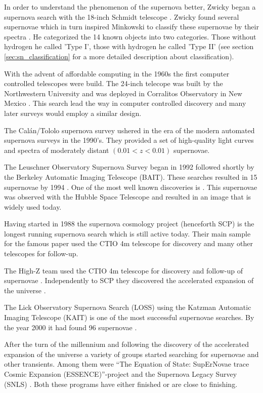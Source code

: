 In order to understand the phenomenon of the supernova better, Zwicky began a supernova search with the 18-inch Schmidt telescope . Zwicky found several supernovae which in turn inspired Minkowski to classify these supernovae by their spectra \citet{1941PASP...53..224M}. 
He categorized the 14 known objects into two categories. Those without hydrogen he called 'Type I', those with hydrogen he called 'Type II' (see section \ref{sec:sn_classification} for a more detailed description about classification).

With the advent of affordable computing in the 1960s the first computer controlled telescopes were build. The 24-inch telecope was built by the Northwestern University and was deployed in Corralitos Observatory in New Mexico \citep{1975PASP...87..565C}. This search lead the way in computer controlled discovery and many later surveys would employ a similar design.

The Cal\'{a}n/Tololo supernova survey \citep{1993AJ....106.2392H} ushered in the era of the modern automated supernova surveys in the 1990's. They provided a set of high-quality light curves and spectra of moderately distant $(0.01 < z < 0.01)$ supernovae.

The Leuschner Observatory Supernova Survey began in 1992 followed shortly by the Berkeley Automatic Imaging Telescope (BAIT). These searches resulted in 15 supernovae by 1994 \citep{1994AAS...185.7905V}. One of the most well known discoveries is . This supernovae was observed with the Hubble Space Telescope and resulted in an image that is widely used today.

Having started in 1988 the supernova cosmology project (henceforth SCP) is the longest running supernova search which is still active today. Their main sample for the famous paper \citep{1999ApJ...517..565P} used the CTIO 4m telescope for discovery and many other telescopes for follow-up.

The High-Z team used the CTIO 4m telescope for discovery and follow-up of supernovae \citep{1998ApJ...507...46S}. Independently to SCP they discovered the accelerated expansion of the universe \citep{1998AJ....116.1009R}.


The Lick Observatory Supernova Search (LOSS) using the Katzman Automatic Imaging Telescope (KAIT) is one of the most successful supernovae searches. By the year 2000 it had found 96 supernovae \citep{2001ASPC..246..121F}. 

After the turn of the millennium and following the discovery of the accelerated expansion of the universe a variety of groups started searching for supernovae and other transients. Among them were ``The Equation of State: SupErNovae trace Cosmic Expansion (ESSENCE)''-project \citep{2002AAS...201.7809G} and the Supernova Legacy Survey (SNLS) \citep{2003AAS...203.8209P}. Both these programs have either finished or are close to finishing. 

